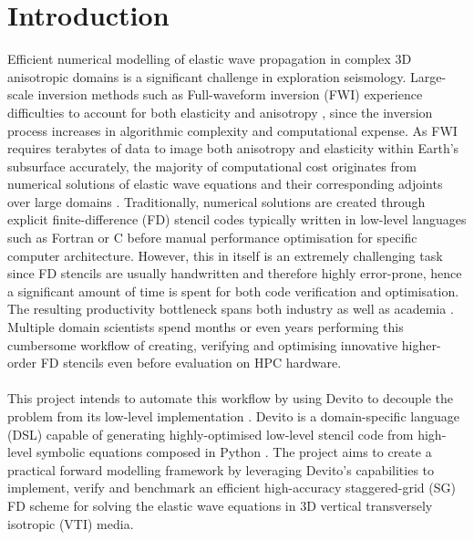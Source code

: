 \section{Introduction}
Efficient numerical modelling of elastic wave propagation in complex 3D anisotropic domains is a significant challenge in exploration seismology. Large-scale inversion methods such as Full-waveform inversion (FWI) experience difficulties to account for both elasticity and anisotropy \citep{kamath2017elastic}, since the inversion process increases in algorithmic complexity and computational expense. As FWI requires terabytes of data to image both anisotropy and elasticity within Earth's subsurface accurately, the majority of computational cost originates from numerical solutions of elastic wave equations and their corresponding adjoints over large domains \citep{witte2019large}. Traditionally, numerical solutions are created through explicit finite-difference (FD) stencil codes \citep{virieux1986p} typically written in low-level languages such as Fortran or C before manual performance optimisation for specific computer architecture. However, this in itself is an extremely challenging task since FD stencils are usually handwritten and therefore highly error-prone, hence a significant amount of time is spent for both code verification and optimisation. The resulting productivity bottleneck spans both industry as well as academia \citep{lange2016devito}. Multiple domain scientists spend months or even years \citep{louboutin2018devito} performing this cumbersome workflow of creating, verifying and optimising innovative higher-order FD stencils even before evaluation on HPC hardware.\\
\\
This project intends to automate this workflow by using Devito to decouple the problem from its low-level implementation \citep{kukreja2016devito}. Devito is a domain-specific language (DSL) capable of generating highly-optimised low-level stencil code from high-level symbolic equations composed in Python \citep{luporini2018architecture}. The project aims to create a practical forward modelling framework by leveraging Devito's capabilities to implement, verify and benchmark an efficient high-accuracy staggered-grid (SG) \citep{bansal2008finite, tarrass2011new} FD scheme \citep{xu2019modeling} for solving the elastic wave equations in 3D vertical transversely isotropic (VTI) media.
